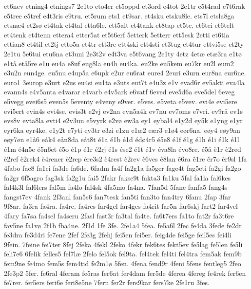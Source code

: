 {et6nev
etning4
etnings7
2e1to
eto4er
et5oppd
et3ord
e4tot
2e1tr
e5t4rad
e7t6rak
e5tree
e5tref
e4t3ris
e9tru.
et5rum
ets1
et9sar.
et4sku
etsku8le.
ets7l
etsla8ga
etsn^^e64
et2s^^f8
et4tak
et4tal
etta6le.
ett5alt
et4tank
et8tap
et5te.
et6tei
et6telt
et4tenk
et4tenn
ettera4
etter5at
et5t6erf
5etterk
5etterr
ett5esk
2etti
et6tia
ettian8
et4til
et2tj
etto5a
et4tr
ett3re
ett4ski
ett4sti
et3tug
et4tur
ettvi5se
et2ty
2e1tu
5e6tui
etu6na
et3uni
2e3t2v
e4t3va
e5t6vang
2e1ty
4etz
4et^^e6
et^^e63ra
e1t^^f8
e1t^^e5
et^^e55re
e1u
eu4a
e8uf
eug8la
eu4h
eu4ka.
eu2ke
eu5kem
eu7kr
eu2l
eum2
e3u2n
eun4ge.
eu5nu
e4up5a
e6upk
e2ur
eu6rat
eure4
2euri
e3urn
eur8na
eur6ne.
euro1
3europ
e3urt
e2us
eu4si
eu1ta
e3uts
eut7t
e4u3z
e1v
evad6r
ev5akti
eva4la
evann4s
e4v5anta
e4varar
e4varb
e4v5ark
e6vatf
6eved
eve5d6a
eve5del
6eveg
e5vegg
evei6s5
even5s
5eventy
e4veny
e9ver.
e5ves.
e5veta
e5vev.
evi4e
evi5ere
evi5ert
evin4s
evi4se.
evis3t
e2vj
ev2na
evn5a4k
ev7nu
ev7oms
e7vri.
ev9r^^e5
ev1s
evs8v
evta8la
evti4
e2v3un
e5vyrk
e2v^^f8
ew3a
ey1
eybal4
e1y2d
ey5k
e1yng
e1yr
eyr6ka
eyr4ke.
e1y2t
e7yti
ey3tr
e3zi
e1zu
e1^^e62
e^^e6r3
e1^^f84
e^^f8r6na.
e^^f8y4
e^^f8y9an
e^^f8y7en
e1^^e56
e^^e5k4
e^^e5n8da
e^^e5t8t
^^e91a
^^e91b
^^e91d
^^e9d^^f84r5
^^e95e8
^^e91f
^^e91g
^^e91h
^^e91i
^^e91k
^^e91l
^^e91m
^^e94n5e
^^e95n6et
^^e95o
^^e91p
^^e91r
^^e92rj
^^e91s
^^e9se2
^^e91t
^^e91v
^^e9va8la
^^e9vo8re.
^^e95^^e5
^^e81r
^^e82red
^^e82ref
^^e82rek4
^^e84rener
^^e82rep
^^e8re3s2
^^e84rest
^^e82rev
^^e86ves
^^ea8lan
^^ea6ra
^^ea1re
^^ear7o
^^ear9sl
1fa
4fabo
fac8
fa1ci
fa3de
fa6de.
6fadm
fa4f
fa2g1a
fa5ger
fage4t
fag5eti
fa2gi
fa2go
fa2gr
6f5agro
fag3sk
fa2g1u
fai5
2fakr
fakse9t
fakta3
fa1ku
5fal
fa1la
fal6kes
fal4k3l
fal6lers
fal5m
fa4lo
fal4sk
4fa5mo
fa4na.
7fan5d
5fane
fanfa5
fang4s
fangst7ev
4fank
2f3anl
fan5s6
fan7tesk
fan5ti
fan3to
fan4try
6fanu
2fap
3far
9f8ar.
fa3ra
fa4ra.
fa4re.
fa4res
far4gel
far4ges
fa4rit
far5n
far6skj
fart2
far4vel
4fary
fa7sa
fa4sel
fa4seru
2fasl
fast3r
fa3tal
fa4te.
fa6t7ers
fa1to
fat2r
fa3t6re
fav5ne
fa1v^^f8
2f1b
fba4ne.
2f1d
1fe
3fe.
2fe1a4
5fea.
fe5a6l
2fec
fe4da
3fede
fe2dr
fe3dra
fe3d4ri
fe7ene
2fef
2fe3g
2fehj
fei5en
fei5er.
feig4de
fei5ge
feil5es
fei4li
9fein.
7feine
fei7ter
8fej
2feka
4fekl
2feko
4fekr
fek6tes
fekt5ev
fe5lag
fe5len
fe5li
feli7e6
6felik
felles5
fel7l^^e6
2felo
fel5ok
fel9ta.
fel4tek
fel4ti
fel4tra
fem5ak
fem9b
fem9ne
fe4mo
fem5s
fem4tid
fe2m1^^f8
5fen.
4fena
fend9r
4feni
5fens
fentleg5
2feo
2fe3p2
5fer.
fe6ral
4feram
fe5ras
fer6at
fer4dam
fer5de
4ferea
4fereg
fe4rek
fer6en
fe7rer.
fer5ers
feri6e
feri8e5ne
7fern
fer2r
fers9kar
fers7ke
2fe1ru
3fes.
}
